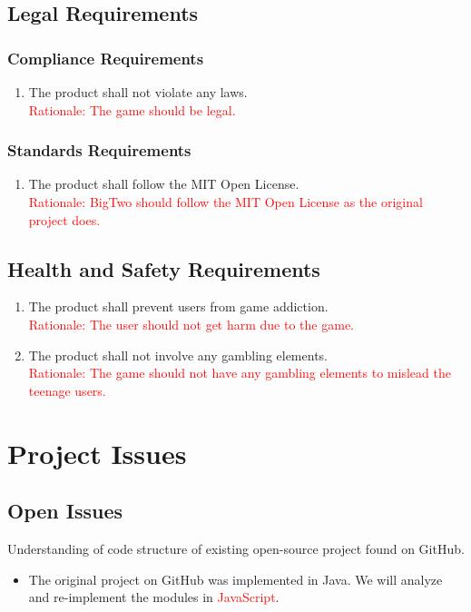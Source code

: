 \documentclass[12pt, titlepage]{article}
\begin{document}
\subsection{Legal Requirements}
\subsubsection{Compliance Requirements}
\begin{enumerate}
    \item The product shall not violate any laws.\\
    \textcolor{red}{Rationale: The game should be legal.}
\end{enumerate}

\subsubsection{Standards Requirements}
\begin{enumerate}
    \item The product shall follow the MIT Open License.\\
    \textcolor{red}{Rationale: BigTwo should follow the MIT Open License as the original project does.}
\end{enumerate}

\subsection{Health and Safety Requirements}
\begin{enumerate}
    \item The product shall prevent users from game addiction.\\
    \textcolor{red}{Rationale: The user should not get harm due to the game.}
    \item The product shall not involve any gambling elements.\\
    \textcolor{red}{Rationale: The game should not have any gambling elements to mislead the teenage users.}
\end{enumerate}


\section{Project Issues}

\subsection{Open Issues}
Understanding of code structure of existing open-source project found on GitHub.
\begin{itemize}
    \item The original project on GitHub was implemented in Java. We will analyze and re-implement the modules in  \textcolor{red}{JavaScript}.
\end{itemize}
\end{document}
